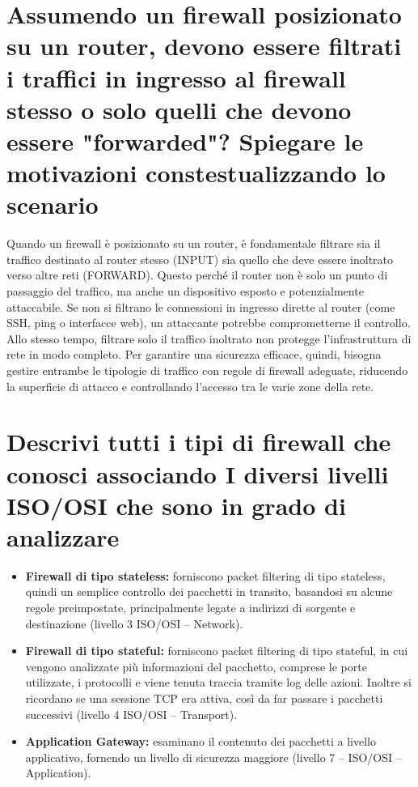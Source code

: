 \documentclass{report}
\begin{document}
\section{Assumendo un firewall posizionato su un router, devono essere filtrati i traffici in
ingresso al firewall stesso o solo quelli che devono essere "forwarded"? Spiegare le
motivazioni constestualizzando lo scenario}
Quando un firewall è posizionato su un router, è fondamentale filtrare sia il traffico destinato al router stesso (INPUT) sia quello che deve essere inoltrato verso altre reti (FORWARD). 
Questo perché il router non è solo un punto di passaggio del traffico, ma anche un dispositivo esposto e potenzialmente attaccabile. Se non si filtrano le connessioni in ingresso dirette al router (come SSH, ping o interfacce web), un attaccante potrebbe comprometterne il controllo. 
Allo stesso tempo, filtrare solo il traffico inoltrato non protegge l'infrastruttura di rete in modo completo. Per garantire una sicurezza efficace, quindi, bisogna gestire entrambe le tipologie di traffico con regole di firewall adeguate, riducendo la superficie di attacco e controllando l'accesso tra le varie zone della rete.


\section{Descrivi tutti i tipi di firewall che conosci associando I diversi livelli ISO/OSI che sono in grado di analizzare}
\begin{itemize}
    \item \textbf{Firewall di tipo stateless:} forniscono packet filtering di tipo stateless, quindi un semplice controllo dei pacchetti in transito, basandosi su alcune regole preimpostate, principalmente legate a indirizzi di sorgente e destinazione (livello 3 ISO/OSI – Network).
    \item \textbf{Firewall di tipo stateful:} forniscono packet filtering di tipo stateful, in cui vengono analizzate più informazioni del pacchetto, comprese le porte utilizzate, i protocolli e viene tenuta traccia tramite log delle azioni. Inoltre si ricordano se una sessione TCP era attiva, così da far passare i pacchetti successivi (livello 4 ISO/OSI – Transport).
    \item \textbf{Application Gateway:} esaminano il contenuto dei pacchetti a livello applicativo, fornendo un livello di sicurezza maggiore (livello 7 – ISO/OSI – Application).
\end{itemize}
\end{document}
